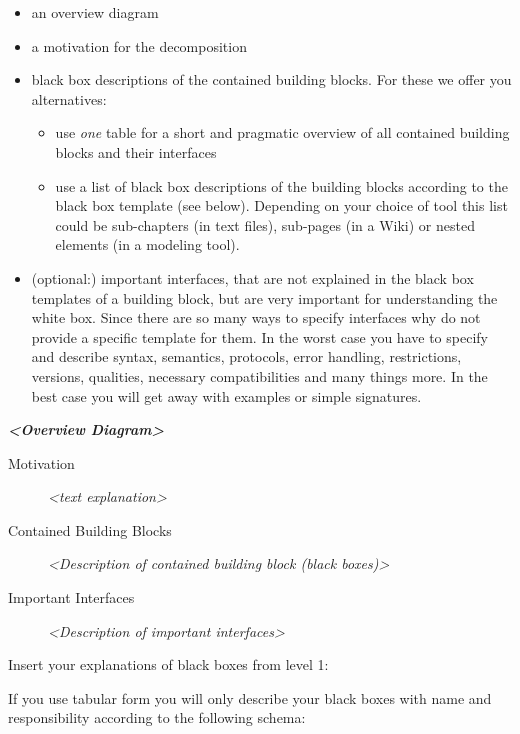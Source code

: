 \begin{itemize}
\item
  an overview diagram
\item
  a motivation for the decomposition
\item
  black box descriptions of the contained building blocks. For these we
  offer you alternatives:

  \begin{itemize}
  \item
    use \emph{one} table for a short and pragmatic overview of all
    contained building blocks and their interfaces
  \item
    use a list of black box descriptions of the building blocks
    according to the black box template (see below). Depending on your
    choice of tool this list could be sub-chapters (in text files),
    sub-pages (in a Wiki) or nested elements (in a modeling tool).
  \end{itemize}
\item
  (optional:) important interfaces, that are not explained in the black
  box templates of a building block, but are very important for
  understanding the white box. Since there are so many ways to specify
  interfaces why do not provide a specific template for them. In the
  worst case you have to specify and describe syntax, semantics,
  protocols, error handling, restrictions, versions, qualities,
  necessary compatibilities and many things more. In the best case you
  will get away with examples or simple signatures.
\end{itemize}

\emph{\textbf{\textless Overview Diagram\textgreater{}}}

\begin{description}
\item[Motivation]
\emph{\textless text explanation\textgreater{}}
\item[Contained Building Blocks]
\emph{\textless Description of contained building block (black
boxes)\textgreater{}}
\item[Important Interfaces]
\emph{\textless Description of important interfaces\textgreater{}}
\end{description}

Insert your explanations of black boxes from level 1:

If you use tabular form you will only describe your black boxes with
name and responsibility according to the following schema:


